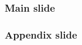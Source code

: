 \documentclass{beamer}
\begin{document}
\begin{frame}
\frametitle{Main slide}
\end{frame}

\appendix

\begin{frame}
\frametitle{Appendix slide}
\end{frame}
\end{document}
